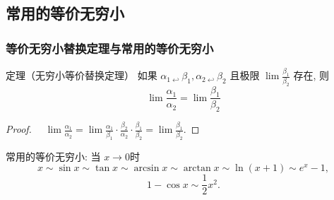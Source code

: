 \documentclass[
10pt,
aspectratio=43,
]{beamer}
\begin{document}
\subsection{常用的等价无穷小}

\begin{frame}
\frametitle{等价无穷小替换定理与常用的等价无穷小}

\begin{block}{定理（无穷小等价替换定理）}
如果 $\alpha_{1 \hookleftarrow} \beta_1, \alpha_{2 \hookleftarrow} \beta_2$ 且极限 $\lim \frac{\beta_1}{\beta_2}$ 存在, 则
$$
\lim \frac{\alpha_1}{\alpha_2}=\lim \frac{\beta_1}{\beta_2}
$$
\end{block}
\pause
\begin{proof}
$\quad \lim \frac{\alpha_1}{\alpha_2}=\lim \frac{\alpha_1}{\beta_1} \cdot \frac{\beta_2}{\alpha_2} \cdot \frac{\beta_1}{\beta_2}=\lim \frac{\beta_1}{\beta_2}$.

\end{proof}
\pause
常用的等价无穷小:
当 $x \rightarrow 0$时
$$
 x \sim \sin x \sim \tan x \sim \arcsin x \sim \arctan x \sim \ln (x+1) \sim e^x-1,
$$
$$
1-\cos x \sim \frac{1}{2} x^2.
$$

\end{frame}
\end{document}
